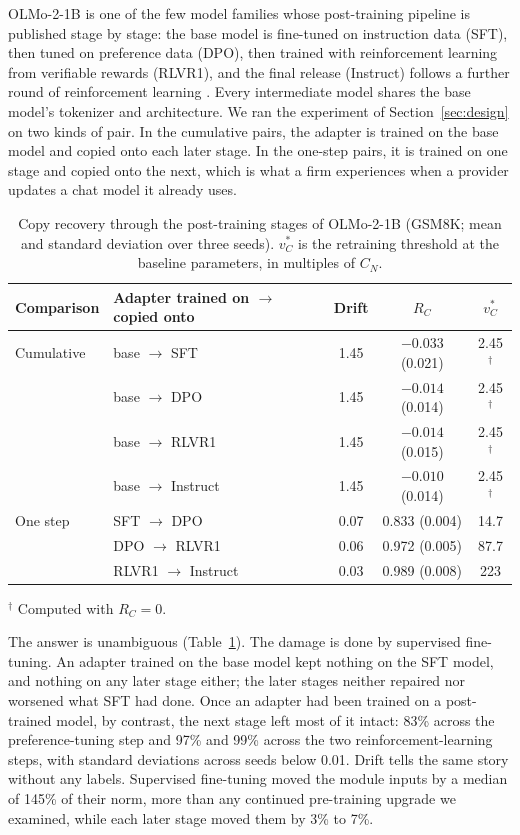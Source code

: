 \documentclass[ijds,nonblindrev]{informs4}
\begin{document}
OLMo-2-1B is one of the few model families whose post-training pipeline is published stage by stage: the base model is fine-tuned on instruction data (SFT), then tuned on preference data (DPO), then trained with reinforcement learning from verifiable rewards (RLVR1), and the final release (Instruct) follows a further round of reinforcement learning \citep{olmo2024olmo2}. Every intermediate model shares the base model's tokenizer and architecture. We ran the experiment of Section~\ref{sec:design} on two kinds of pair. In the cumulative pairs, the adapter is trained on the base model and copied onto each later stage. In the one-step pairs, it is trained on one stage and copied onto the next, which is what a firm experiences when a provider updates a chat model it already uses.

\begin{table}[t]
\centering
\caption{Copy recovery through the post-training stages of OLMo-2-1B (GSM8K; mean and standard deviation over three seeds). $v^*_C$ is the retraining threshold at the baseline parameters, in multiples of $C_N$.}\label{tab:stages}
\small
\begin{tabular}{llccc}
\toprule
Comparison & Adapter trained on $\to$ copied onto & Drift & $R_C$ & $v^*_C$\\
\midrule
Cumulative & base $\to$ SFT & 1.45 & $-0.033$ (0.021) & 2.45$^\dagger$\\
 & base $\to$ DPO & 1.45 & $-0.014$ (0.014) & 2.45$^\dagger$\\
 & base $\to$ RLVR1 & 1.45 & $-0.014$ (0.015) & 2.45$^\dagger$\\
 & base $\to$ Instruct & 1.45 & $-0.010$ (0.014) & 2.45$^\dagger$\\
One step & SFT $\to$ DPO & 0.07 & 0.833 (0.004) & 14.7\\
 & DPO $\to$ RLVR1 & 0.06 & 0.972 (0.005) & 87.7\\
 & RLVR1 $\to$ Instruct & 0.03 & 0.989 (0.008) & 223\\
\bottomrule
\end{tabular}

\smallskip\footnotesize $^\dagger$ Computed with $R_C=0$.
\end{table}

The answer is unambiguous (Table~\ref{tab:stages}). The damage is done by supervised fine-tuning. An adapter trained on the base model kept nothing on the SFT model, and nothing on any later stage either; the later stages neither repaired nor worsened what SFT had done. Once an adapter had been trained on a post-trained model, by contrast, the next stage left most of it intact: 83\% across the preference-tuning step and 97\% and 99\% across the two reinforcement-learning steps, with standard deviations across seeds below 0.01. Drift tells the same story without any labels. Supervised fine-tuning moved the module inputs by a median of 145\% of their norm, more than any continued pre-training upgrade we examined, while each later stage moved them by 3\% to 7\%.
\end{document}

